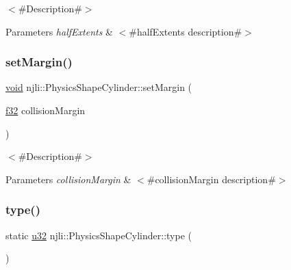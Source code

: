 $<$\#\+Description\#$>$


\begin{DoxyParams}{Parameters}
{\em half\+Extents} & $<$\#half\+Extents description\#$>$ \\
\hline
\end{DoxyParams}
\mbox{\label{classnjli_1_1_physics_shape_cylinder_ab264eaa033bd9f0d19030290c12b58b4}} 
\subsubsection{\texorpdfstring{set\+Margin()}{setMargin()}}
{\footnotesize\ttfamily \mbox{\hyperlink{_thread_8h_af1e856da2e658414cb2456cb6f7ebc66}{void}} njli\+::\+Physics\+Shape\+Cylinder\+::set\+Margin (\begin{DoxyParamCaption}\item[{\mbox{\hyperlink{_util_8h_a5f6906312a689f27d70e9d086649d3fd}{f32}}}]{collision\+Margin }\end{DoxyParamCaption})}

$<$\#\+Description\#$>$


\begin{DoxyParams}{Parameters}
{\em collision\+Margin} & $<$\#collision\+Margin description\#$>$ \\
\hline
\end{DoxyParams}
\mbox{\label{classnjli_1_1_physics_shape_cylinder_a3a7aa75547f61cdfbb292e64ac18190a}} 
\subsubsection{\texorpdfstring{type()}{type()}}
{\footnotesize\ttfamily static \mbox{\hyperlink{_util_8h_a10e94b422ef0c20dcdec20d31a1f5049}{u32}} njli\+::\+Physics\+Shape\+Cylinder\+::type (\begin{DoxyParamCaption}{ }\end{DoxyParamCaption})\hspace{0.3cm}{\ttfamily [static]}}


